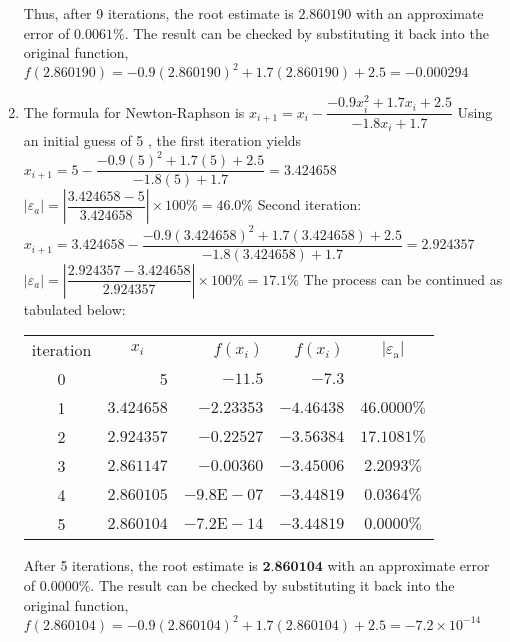 \documentclass[../main.tex]{subfiles}
\begin{document}
\begin{enumerate}[label=\bfseries(\alph*)]
\bigbreak
Thus, after 9 iterations, the root estimate is $2.860190$ with an approximate error of $0.0061 \%$. The result can be checked by substituting it back into the original function,
\bigbreak
$f(2.860190)=-0.9(2.860190)^{2}+1.7(2.860190)+2.5=-0.000294$
\bigbreak
\item The formula for Newton-Raphson is
\bigbreak
$x_{i+1}=x_{i}-\dfrac{-0.9 x_{i}^{2}+1.7 x_{i}+2.5}{-1.8 x_{i}+1.7}$
\bigbreak
Using an initial guess of 5 , the first iteration yields
\bigbreak
$x_{i+1}=5-\dfrac{-0.9(5)^{2}+1.7(5)+2.5}{-1.8(5)+1.7}=3.424658$
\bigbreak
$\left|\varepsilon_{a}\right|=\left|\dfrac{3.424658-5}{3.424658}\right| \times 100 \%=46.0 \%$
\bigbreak
Second iteration:
\bigbreak
$x_{i+1}=3.424658-\dfrac{-0.9(3.424658)^{2}+1.7(3.424658)+2.5}{-1.8(3.424658)+1.7}=2.924357$
\bigbreak
$\left|\varepsilon_{a}\right|=\left|\dfrac{2.924357-3.424658}{2.924357}\right| \times 100 \%=17.1 \%$
\bigbreak
The process can be continued as tabulated below:
\bigbreak
\begin{tabular}{crrrc}
iteration & \multicolumn{1}{c}{$x_{i}$} & $f\left(x_{i}\right)$ & $f\left(x_{i}\right)$ & $\left|\varepsilon_{\mathrm{a}}\right|$ \\
0 & 5 & $-11.5$ & $-7.3$ &  \\
1 & $3.424658$ & $-2.23353$ & $-4.46438$ & $46.0000 \%$ \\
2 & $2.924357$ & $-0.22527$ & $-3.56384$ & $17.1081 \%$ \\
3 & $2.861147$ & $-0.00360$ & $-3.45006$ & $2.2093 \%$ \\
4 & $2.860105$ & $-9.8 \mathrm{E}-07$ & $-3.44819$ & $0.0364 \%$ \\
5 & $2.860104$ & $-7.2 \mathrm{E}-14$ & $-3.44819$ & $0.0000 \%$ \\
\end{tabular}
\bigbreak
After 5 iterations, the root estimate is $\mathbf{2 . 8 6 0 1 0 4}$ with an approximate error of $0.0000 \%$. The result can be checked by substituting it back into the original function,
\bigbreak
$f(2.860104)=-0.9(2.860104)^{2}+1.7(2.860104)+2.5=-7.2 \times 10^{-14}$
\bigbreak


\end{enumerate}
\end{document}
